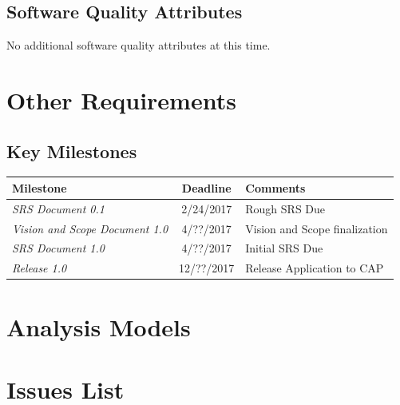\documentclass[12pt, letterpaper]{article}
\begin{document}
  \subsection{Software Quality Attributes}
	No additional software quality attributes at this time.

  \newpage
\section{Other Requirements}
  \subsection{Key Milestones}
  \begin{tabularx}{\textwidth}{l c l}
    \hline
    \textbf{Milestone} & \textbf{Deadline} & \textbf{Comments}\\
    \hline
    \textit{SRS Document 0.1} & 2/24/2017 & Rough SRS Due \\
    \textit{Vision and Scope Document 1.0} & 4/??/2017 & Vision and Scope finalization \\
    \textit{SRS Document 1.0} & 4/??/2017 & Initial SRS Due \\
    \textit{Release 1.0} & 12/??/2017 & Release Application to CAP \\
    \hline
  \end{tabularx}
\newpage
  \appendix

\section{Analysis Models}

\section{Issues List}

{}

\end{document}
